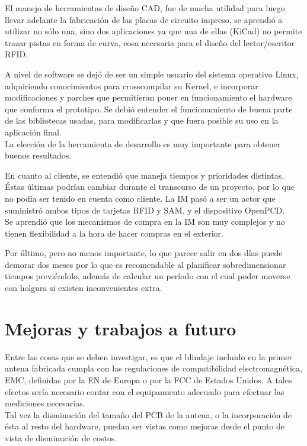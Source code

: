 \bigskip
El manejo de herramientas de diseño CAD, fue de mucha utilidad para luego
llevar adelante la fabricación de las placas de circuito impreso, se aprendió a utilizar
no sólo una, sino dos aplicaciones ya que una de ellas (KiCad) no permite trazar
pistas en forma de curva, cosa necesaria para el diseño del lector/escritor RFID.

\bigskip
A nivel de software se dejó de ser un simple usuario del sistema operativo
Linux, adquiriendo conocimientos para crosscompilar su Kernel, e incorporar
modificaciones y parches que permitieran poner en funcionamiento el hardware
que conforma el prototipo. Se debió entender el funcionamiento de buena parte
de las bibliotecas usadas, para modificarlas y que fuera posible su uso en la 
aplicación final.\\
La elección de la herramienta de desarrollo es muy importante para obtener buenos resultados.

\bigskip
En cuanto al cliente, se entendió que maneja tiempos y prioridades distintas. Éstas últimas
podrían cambiar durante el transcurso de un proyecto, por lo que no podía ser 
tenido en cuenta como cliente. La IM pasó a ser un actor que suministró ambos tipos de
tarjetas RFID y SAM, y el dispositivo OpenPCD. \\
Se aprendió que los mecanismos de compra en la IM son muy complejos y no tienen flexibilidad
a la hora de hacer compras en el exterior.

\bigskip
Por último, pero no menos importante, lo que parece salir en dos días puede demorar dos meses por lo que es recomendable al planificar sobredimensionar tiempos previéndolo, además de calcular un período con el cual poder moverse con holgura si existen inconvenientes extra.



\section{Mejoras y trabajos a futuro}
Entre las cosas que se deben investigar, es que el blindaje incluido en la 
primer antena fabricada cumpla con las regulaciones de compatibilidad 
electromagnética, EMC, definidas por la EN de Europa o por la FCC de Estados 
Unidos. A tales efectos sería necesario contar con el equipamiento adecuado
para efectuar las mediciones necesarias.\\
Tal vez la disminución del tamaño del PCB de la antena, o la incorporación
de ésta al resto del hardware, puedan ser vistas como mejoras desde el 
punto de vista de disminución de costos.

